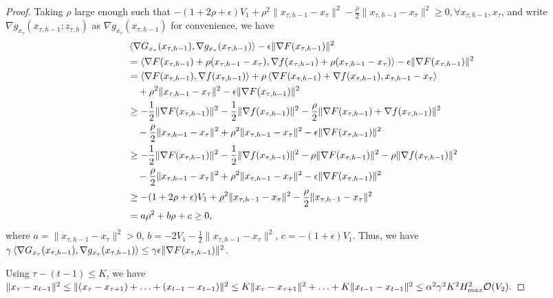 \documentclass{opt2020} %
\begin{document}
\begin{proof}
Taking $\rho$ large enough such that $- (1 + 2 \rho + \epsilon) V_1 + \rho^2 \|x_{\tau, h-1} - x_\tau\|^2 - \frac{\rho}{2} \|x_{\tau, h-1} - x_\tau\|^2 \geq 0, \forall x_{\tau, h-1}, x_{\tau}$, and write $\nabla g_{x_\tau}(x_{\tau, h-1}; z_{\tau, h})$ as $\nabla g_{x_\tau}(x_{\tau, h-1})$ for convenience, we have
\begin{align*}
&\left\langle \nabla G_{x_\tau}(x_{\tau, h-1}), \nabla g_{x_\tau}(x_{\tau, h-1}) \right \rangle - \epsilon \|\nabla F(x_{\tau, h-1})\|^2 \\
&= \left\langle \nabla F(x_{\tau, h-1}) + \rho (x_{\tau, h-1} - x_\tau), \nabla f(x_{\tau, h-1}) + \rho (x_{\tau, h-1} - x_\tau) \right \rangle - \epsilon \|\nabla F(x_{\tau, h-1})\|^2 \\
&= \left\langle \nabla F(x_{\tau, h-1}), \nabla f(x_{\tau, h-1}) \right \rangle + \rho \left\langle \nabla F(x_{\tau, h-1}) + \nabla f(x_{\tau, h-1}), x_{\tau, h-1} - x_\tau \right \rangle \\
&\quad + \rho^2 \|x_{\tau, h-1} - x_\tau\|^2 - \epsilon \|\nabla F(x_{\tau, h-1})\|^2 \\
&\geq -\frac{1}{2} \|\nabla F(x_{\tau, h-1})\|^2 - \frac{1}{2} \|\nabla f(x_{\tau, h-1})\|^2 -\frac{\rho}{2} \|\nabla F(x_{\tau, h-1}) + \nabla f(x_{\tau, h-1})\|^2  \\
&\quad -\frac{\rho}{2} \|x_{\tau, h-1} - x_\tau\|^2 + \rho^2 \|x_{\tau, h-1} - x_\tau\|^2 - \epsilon \|\nabla F(x_{\tau, h-1})\|^2 \\
&\geq -\frac{1}{2} \|\nabla F(x_{\tau, h-1})\|^2 - \frac{1}{2} \|\nabla f(x_{\tau, h-1})\|^2 -\rho \|\nabla F(x_{\tau, h-1}) \|^2 - \rho \| \nabla f(x_{\tau, h-1})\|^2  \\
&\quad -\frac{\rho}{2} \|x_{\tau, h-1} - x_\tau\|^2 + \rho^2 \|x_{\tau, h-1} - x_\tau\|^2 - \epsilon \|\nabla F(x_{\tau, h-1})\|^2 \\
&\geq - (1 + 2 \rho + \epsilon) V_1 + \rho^2 \|x_{\tau, h-1} - x_\tau\|^2 - \frac{\rho}{2} \|x_{\tau, h-1} - x_\tau\|^2 \\
&= a \rho^2 + b \rho + c \geq 0,
\end{align*}
where $a = \|x_{\tau, h-1} - x_\tau\|^2 > 0$, $b = -2 V_1 - \frac{1}{2} \|x_{\tau, h-1} - x_\tau\|^2$, $c = - (1 + \epsilon) V_1$.
Thus, we have $\gamma \left\langle \nabla G_{x_\tau}(x_{\tau, h-1}), \nabla g_{x_\tau}(x_{\tau, h-1}) \right \rangle \leq \gamma \epsilon \|\nabla F(x_{\tau, h-1})\|^2$.

Using $\tau - (t-1) \leq K$, we have
$
\|x_\tau - x_{t-1}\|^2
\leq \|(x_\tau - x_{\tau+1}) + \ldots + (x_{t-1} - x_{t-1})\|^2
\leq K\|x_\tau - x_{\tau+1}\|^2 + \ldots + K\|x_{t-1} - x_{t-1}\|^2
\leq \alpha^2\gamma^2 K^2 H_{max}^2 {\mathcal O}(V_2).
$


\end{proof}
\end{document}
